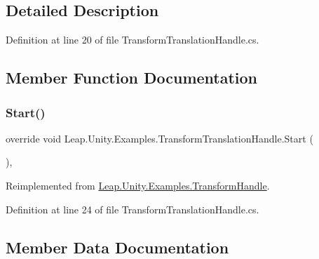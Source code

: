 \subsection{Detailed Description}


Definition at line 20 of file Transform\+Translation\+Handle.\+cs.



\subsection{Member Function Documentation}
\mbox{\label{class_leap_1_1_unity_1_1_examples_1_1_transform_translation_handle_af127ad72e9df2429fab712a75b16e115}} 
\subsubsection{\texorpdfstring{Start()}{Start()}}
{\footnotesize\ttfamily override void Leap.\+Unity.\+Examples.\+Transform\+Translation\+Handle.\+Start (\begin{DoxyParamCaption}{ }\end{DoxyParamCaption})\hspace{0.3cm}{\ttfamily [protected]}, {\ttfamily [virtual]}}



Reimplemented from \mbox{\hyperlink{class_leap_1_1_unity_1_1_examples_1_1_transform_handle_ab2c8be5053c981fff46ab6b5f99cac13}{Leap.\+Unity.\+Examples.\+Transform\+Handle}}.



Definition at line 24 of file Transform\+Translation\+Handle.\+cs.



\subsection{Member Data Documentation}
\mbox{\label{class_leap_1_1_unity_1_1_examples_1_1_transform_translation_handle_a12667312bb2935f407f0267fcea4384e}} 
